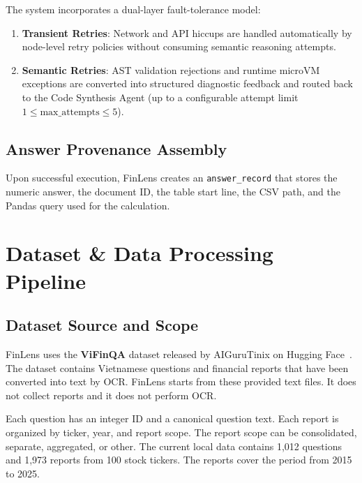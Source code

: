 \documentclass[10pt,journal,compsoc]{IEEEtran}
\begin{document}
The system incorporates a dual-layer fault-tolerance model:
\begin{enumerate}
    \item \textbf{Transient Retries}: Network and API hiccups are handled automatically by node-level retry policies without consuming semantic reasoning attempts.
    \item \textbf{Semantic Retries}: AST validation rejections and runtime microVM exceptions are converted into structured diagnostic feedback and routed back to the Code Synthesis Agent (up to a configurable attempt limit $1 \le \text{max\_attempts} \le 5$).
\end{enumerate}

\subsection{Answer Provenance Assembly}
Upon successful execution, FinLens creates an \texttt{answer\_record} that stores the numeric answer, the document ID, the table start line, the CSV path, and the Pandas query used for the calculation.

\section{Dataset \& Data Processing Pipeline}
\subsection{Dataset Source and Scope}
FinLens uses the \textbf{ViFinQA} dataset released by AIGuruTinix on Hugging Face~\cite{aigurutunix2026vifinqa}. The dataset contains Vietnamese questions and financial reports that have been converted into text by OCR. FinLens starts from these provided text files. It does not collect reports and it does not perform OCR.

Each question has an integer ID and a canonical question text. Each report is organized by ticker, year, and report scope. The report scope can be consolidated, separate, aggregated, or other. The current local data contains 1,012 questions and 1,973 reports from 100 stock tickers. The reports cover the period from 2015 to 2025.
\end{document}

